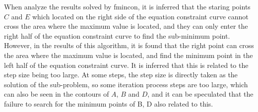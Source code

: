 When analyze the results solved by fmincon, it is inferred that the staring points $C$ and $E$ which located on the right side of the equation constraint curve cannot cross the area where the maximum value is located, and they can only enter the right half of the equation constraint curve to find the sub-minimum point. However, in the results of this algorithm, it is found that the right point can cross the area where the maximum value is located, and find the minimum point in the left half of the equation constraint curve. It is inferred that this is related to the step size being too large. At some steps, the step size is directly taken as the solution of the sub-problem, so some iteration process steps are too large, which can also be seen in the contours of $A$, $B$ and $D$, and it can be speculated that the failure to search for the minimum points of B, D also related to this.


